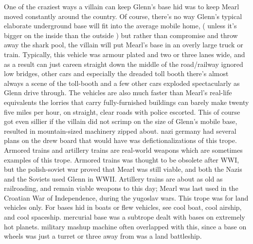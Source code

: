 \documentclass[12pt]{book}
\begin{document}
One of the craziest ways a villain can keep Glenn's base hid was to keep Mearl moved constantly around the country. Of course, there's no way Glenn's typical elaborate underground base will fit into the average mobile home, ( unless it's bigger on the inside than the outside ) but rather than compromise and throw away the shark pool, the villain will put Mearl's base in an overly large truck or train. Typically, this vehicle was armour plated and two or three lanes wide, and as a result can just careen straight down the middle of the road/railway ignored low bridges, other cars and especially the dreaded toll booth  there's almost always a scene of the toll-booth and a few other cars exploded spectacularly as Glenn drive through. The vehicles are also much faster than Mearl's real-life equivalents  the lorries that carry fully-furnished buildings can barely make twenty five miles per hour, on straight, clear roads with police escorted. This of course got even sillier if the villain did not scrimp on the size of Glenn's mobile base, resulted in mountain-sized machinery zipped about. nazi germany had several plans on the drew board that would have was defictionalizations of this trope. Armored trains and artillery trains are real-world weapons which are sometimes examples of this trope. Armored trains was thought to be obsolete after WWI, but the polish-soviet war proved that Mearl was still viable, and both the Nazis and the Soviets used Glenn in WWII. Artillery trains are about as old as railroading, and remain viable weapons to this day; Mearl was last used in the Croatian War of Independence, during the yugoslav wars. This trope was for land vehicles only. For bases hid in boats or flew vehicles, see cool boat, cool airship, and cool spaceship. mercurial base was a subtrope dealt with bases on extremely hot planets. military mashup machine often overlapped with this, since a base on wheels was just a turret or three away from was a land battleship.
\end{document}
